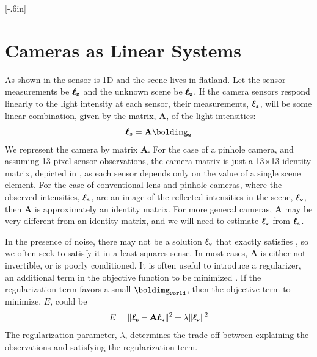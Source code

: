 [-.6in]

\section{Cameras as Linear Systems}


As shown in  the sensor is
1D and the scene lives in flatland.  
Let the sensor
measurements be $\boldsymbol\ell_{\texttt{s}}$ and the unknown scene be $\boldsymbol\ell_{\texttt{w}}$.  
If
the camera sensors respond linearly to the light intensity at each
sensor, their measurements, $\boldsymbol\ell_{\texttt{s}}$, will be some linear combination, given by the matrix, $\mathbf{A}$,
of the light intensities:
\begin{equation}
\boldimgsensor = \mathbf{A} \boldimg_{\texttt{w}}
\label{eq:likelihood}
\end{equation}
We
represent the camera by matrix $\mathbf{A}$.  For the case of a pinhole
camera, and assuming 13 pixel sensor
observations, the camera matrix is just a 13$\times$13 identity matrix, depicted in 
, as each sensor depends only on the value of a single scene element.  
For the case of conventional lens and pinhole cameras, where the observed intensities,
$\boldsymbol\ell_{\texttt{s}}$, are an image of the reflected intensities in the scene,
$\boldsymbol\ell_{\texttt{w}}$, then $\mathbf{A}$ is approximately an identity matrix. For more general cameras, $\mathbf{A}$ may be very different from an
identity matrix, and we will need to estimate $\boldsymbol\ell_{\texttt{w}}$ from $\boldsymbol\ell_{\texttt{s}}$.

  In the presence of noise, there may not be a solution
$\boldsymbol\ell_{\texttt{w}}$ that exactly satisfies \eqn{\ref{eq:likelihood}}, so we
often seek to satisfy it in a least squares sense.  In most cases, $\mathbf{A}$ is either not invertible, or is poorly
conditioned.  It is often useful
to introduce a regularizer, an additional term in the objective
function to be minimized \cite{Poggio85}.  If the regularization term favors a small
$\boldimg_{\texttt{world}}$, then the objective term to minimize, $E$, could be
\begin{equation}
E = \lVert \boldsymbol\ell_{\texttt{s}} - \mathbf{A} \boldsymbol\ell_{\texttt{w}} \rVert ^2 + \lambda \lVert \boldsymbol\ell_{\texttt{w}} \rVert ^2
\label{eq:posterior}
\end{equation}
The regularization parameter, $\lambda$, determines the trade-off between explaining the observations and satisfying the regularization term. 


